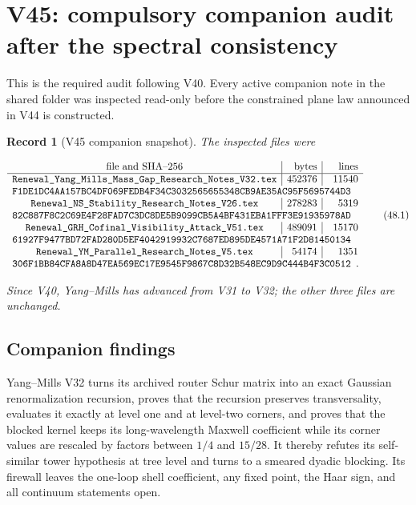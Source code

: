 \documentclass[11pt]{article}
\newtheorem{record}[theorem]{Record}
\theoremstyle{remark}
\begin{document}
\section{V45: compulsory companion audit after the spectral consistency}
\label{sec:v19v45}

This is the required audit following V40.  Every active companion note
in the shared folder was inspected read-only before the constrained
plane law announced in V44 is constructed.

\begin{record}[V45 companion snapshot]
\label{rec:v19v45-snapshot}
The inspected files were

\[
\begin{array}{c|r|r}
\hbox{file and SHA--256}&\hbox{bytes}&\hbox{lines}\\ \hline
\texttt{Renewal\_Yang\_Mills\_Mass\_Gap\_Research\_Notes\_V32.tex}
&452376&11540\\
\multicolumn{3}{l}{
\texttt{F1DE1DC4AA157BC4DF069FEDB4F34C3032565655348CB9AE35AC95F5695744D3}}
\\
\texttt{Renewal\_NS\_Stability\_Research\_Notes\_V26.tex}
&278283&5319\\
\multicolumn{3}{l}{
\texttt{82C887F8C2C69E4F28FAD7C3DC8DE5B9099CB5A4BF431EBA1FFF3E91935978AD}}
\\
\texttt{Renewal\_GRH\_Cofinal\_Visibility\_Attack\_V51.tex}
&489091&15170\\
\multicolumn{3}{l}{
\texttt{61927F9477BD72FAD280D5EF4042919932C7687ED895DE4571A71F2D81450134}}
\\
\texttt{Renewal\_YM\_Parallel\_Research\_Notes\_V5.tex}
&54174&1351\\
\multicolumn{3}{l}{
\texttt{306F1BB84CFA8A8D47EA569EC17E9545F9867C8D32B548EC9D9C444B4F3C0512}}.
\end{array}                                                     \tag{48.1}
\]

Since V40, Yang--Mills has advanced from V31 to V32; the other three
files are unchanged.
\end{record}

\subsection{Companion findings}

Yang--Mills V32 turns its archived router Schur matrix into an exact
Gaussian renormalization recursion, proves that the recursion preserves
transversality, evaluates it exactly at level one and at level-two
corners, and proves that the blocked kernel keeps its long-wavelength
Maxwell coefficient while its corner values are rescaled by factors
between \(1/4\) and \(15/28\).  It thereby refutes its self-similar
tower hypothesis at tree level and turns to a smeared dyadic blocking.
Its firewall leaves the one-loop shell coefficient, any fixed point, the
Haar sign, and all continuum statements open.
\end{document}
